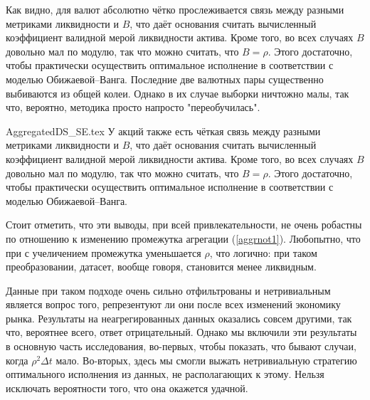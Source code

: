 Как видно, для валют абсолютно чётко прослеживается связь между разными метриками ликвидности и $B$,
что даёт основания считать вычисленный коэффициент валидной мерой ликвидности актива. Кроме того, 
во всех случаях $B$ довольно мал по модулю, так что можно считать, что $B = \rho$. Этого достаточно,
чтобы практически осуществить оптимальное исполнение в соответствии с моделью Обижаевой--Ванга.
Последние две валютных пары существенно выбиваются из общей колеи. Однако в их случае выборки ничтожно малы,
так что, вероятно, методика просто напросто "переобучилась".
\par
{AggregatedDS_SE.tex}
У акций также есть чёткая связь между разными метриками ликвидности и $B$,
что даёт основания считать вычисленный коэффициент валидной мерой ликвидности актива. Кроме того, 
во всех случаях $B$ довольно мал по модулю, так что можно считать, что $B = \rho$. Этого достаточно,
чтобы практически осуществить оптимальное исполнение в соответствии с моделью Обижаевой--Ванга.
\par
Стоит отметить, что эти выводы, при всей привлекательности, не очень робастны по отношению к изменению промежутка 
агрегации (\ref{aggrnot1}). Любопытно, что при с учеличением промежутка уменьшается $\rho$, что логично:
при таком преобразовании, датасет, вообще говоря, становится менее ликвидным.
\par
Данные при таком подходе очень сильно отфильтрованы и нетривиальным является вопрос того,
репрезентуют ли они после всех изменений экономику рынка. Результаты на неагрегированных 
данных оказались совсем другими, так что, вероятнее всего, ответ отрицательный. Однако мы
включили эти результаты в основную часть исследования, во-первых, чтобы показать, что 
бывают случаи, когда $\rho^2 \Delta t$ мало. Во-вторых, здесь мы смогли выжать нетривиальную стратегию
оптимального исполнения из данных, не располагающих к этому. Нельзя исключать вероятности того,
что она окажется удачной.



